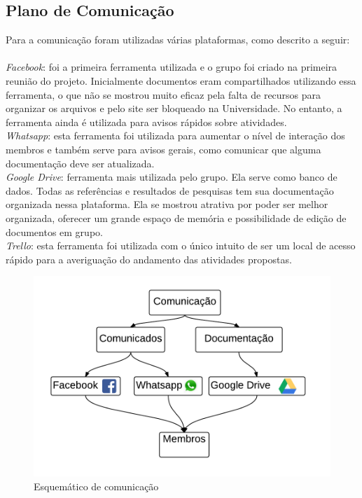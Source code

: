 \subsection{Plano de Comunica\c{c}\~ao}

Para a comunica\c{c}\~ao foram utilizadas v\'arias plataformas, como descrito a seguir:
\\ \\ \textit {Facebook}: foi a primeira ferramenta utilizada e o grupo foi criado na primeira reuni\~ao do projeto. Inicialmente documentos eram compartilhados utilizando essa ferramenta, o que n\~ao se mostrou muito eficaz pela falta de recursos para organizar os arquivos e pelo site ser bloqueado na Universidade. No entanto, a ferramenta ainda \'e utilizada para avisos r\'apidos sobre atividades. 
\\ \textit{Whatsapp}: esta ferramenta foi utilizada para aumentar o n\'ivel de intera\c{c}\~ao dos membros e tamb\'em serve para avisos gerais, como comunicar que alguma documenta\c{c}\~ao deve ser atualizada.
\\ \textit{Google Drive}: ferramenta mais utilizada pelo grupo. Ela serve como banco de dados. Todas as refer\^encias e resultados de pesquisas tem sua documenta\c{c}\~ao organizada nessa plataforma. Ela se mostrou atrativa por poder ser melhor organizada, oferecer um grande espa\c{c}o de mem\'oria e possibilidade de edi\c{c}\~ao de documentos em grupo.
\\ \textit{Trello}: esta ferramenta foi utilizada com o \'unico intuito de ser um local de acesso r\'apido para a averigua\c{c}\~ao do andamento das atividades propostas.

\begin{figure}[H]
	\centering
	\label{comunicacao}
		\includegraphics[keepaspectratio=true,scale=0.7]{figuras/comunicacao.png}
	\caption{Esquem\'atico de comunica\c{c}\~ao}
\end{figure}

